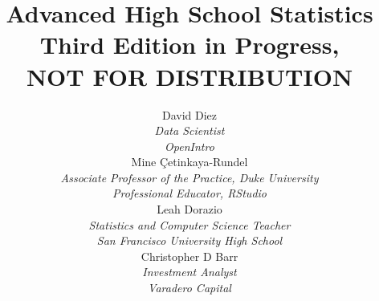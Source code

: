 
\title{\huge Advanced High School Statistics\vspace{1.5mm} \\ \Large Third Edition in Progress,\vspace{1.5mm}\\ \huge NOT FOR DISTRIBUTION}
\author{David Diez \\
\small\emph{Data Scientist}\\
\small\emph{OpenIntro} \\[6mm]
Mine \c{C}etinkaya-Rundel \\
\small\emph{Associate Professor of the Practice,
    Duke University} \\
\small\emph{Professional Educator, RStudio} \\[6mm]
Leah Dorazio \\
\small\emph{Statistics and Computer Science Teacher}\\
\small\emph{San Francisco University High School} \\[6mm]
Christopher D Barr \\
\small\emph{Investment Analyst} \\
\small\emph{Varadero Capital} \\
}

